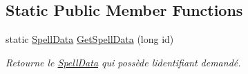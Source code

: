 \subsection*{Static Public Member Functions}
\begin{DoxyCompactItemize}
\item 
static \hyperlink{class_tentacle_slicers_1_1spells_1_1_spell_data}{Spell\+Data} \hyperlink{class_tentacle_slicers_1_1spells_1_1_spell_data_a15f445cba6452dea32e963b683873f27}{Get\+Spell\+Data} (long id)
\begin{DoxyCompactList}\small\item\em Retourne le \hyperlink{class_tentacle_slicers_1_1spells_1_1_spell_data}{Spell\+Data} qui possède l\textquotesingle{}identifiant demandé. \end{DoxyCompactList}\end{DoxyCompactItemize}

